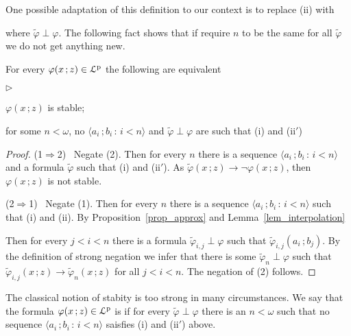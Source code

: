 \documentclass{amsproc}
\newcommand{\mylabel}[1]{{#1}\hfill}
\renewenvironment{itemize}
  {\begin{list}{$\triangleright$}{%
  \setlength{\parskip}{0mm}
  \setlength{\topsep}{.4\baselineskip}
  \setlength{\rightmargin}{0mm}
  \setlength{\listparindent}{0mm}
  \setlength{\itemindent}{0mm}
  \setlength{\labelwidth}{3ex}
  \setlength{\itemsep}{.2\baselineskip}
  \setlength{\parsep}{.2\baselineskip}
  \setlength{\partopsep}{0mm}
  \setlength{\labelsep}{1ex}
  \setlength{\leftmargin}{\labelwidth+\labelsep}
  \let\makelabel\mylabel}}{%
\end{list}}
\renewcommand*{\emph}[1]{%
   \smash{\tikz[baseline]\node[rectangle, fill=teal!25, rounded corners, inner xsep=0.5ex, inner ysep=0.2ex, anchor=base, minimum height = 2.7ex]{\strut #1};}}
\begin{document}
{


One possible adaptation of this definition to our context is to replace (ii) with


where $\tilde\varphi\perp\varphi$.
The following fact shows that if require $n$ to be the same for all $\tilde\varphi$ we do not get anything new.

\begin{fact}\label{fact_stable_p}
  For every $\varphi(x\,;z)\in{\EuScript L}^{\rm p}$ the following are equivalent
  \begin{itemize}
    \item[1.] $\varphi(x\,;z)$ is stable;
    \item[2.] for some $n<\omega$, no $\langle a_i\,;b_i\,:\,i<n\rangle$ and $\tilde\varphi\perp\varphi$ are such that (i) and (ii$'$)
  \end{itemize} 
\end{fact}

\begin{proof}
  (1$\Rightarrow$2) \ 
  Negate (2).
  Then for every $n$ there is a sequence $\langle a_i\,;b_i\,:\,i<n\rangle$ and a formula $\tilde\varphi$ such that (i) and (ii$'$).
  As $\tilde\varphi(x\,;z)\rightarrow\neg\varphi(x\,;z)$, then $\varphi(x\,;z)$ is not stable.

  (2$\Rightarrow$1) \ 
  Negate (1).
  Then for every $n$ there is a sequence $\langle a_i\,;b_i\,:\,i<n\rangle$ such that (i) and (ii).
  By Proposition~\ref{prop_approx} and Lemma~\ref{lem_interpolation}
  
  
  Then for every $j<i<n$ there is a formula  $\tilde\varphi_{i,j}\perp\varphi$ such that $\tilde\varphi_{i,j}(a_i\,;b_j)$.
  By the definition of strong negation we infer that there is some $\tilde\varphi_n\perp\varphi$ such that $\tilde\varphi_{i,j}(x\,;z)\rightarrow\tilde\varphi_n(x\,;z)$ for all $j<i<n$.
  The negation of (2) follows.
\end{proof}

The classical notion of stabity is too strong in many circumstances.
We say that the formula $\varphi(x\,;z)\in{\EuScript L}^{\rm p}$ is \emph{weakly stable\/} if for every $\tilde\varphi\perp\varphi$ there is an $n<\omega $ such that no sequence $\langle a_i\,;b_i\,:\,i<n\rangle$ saisfies (i) and (ii$'$) above.

}
\end{document}
